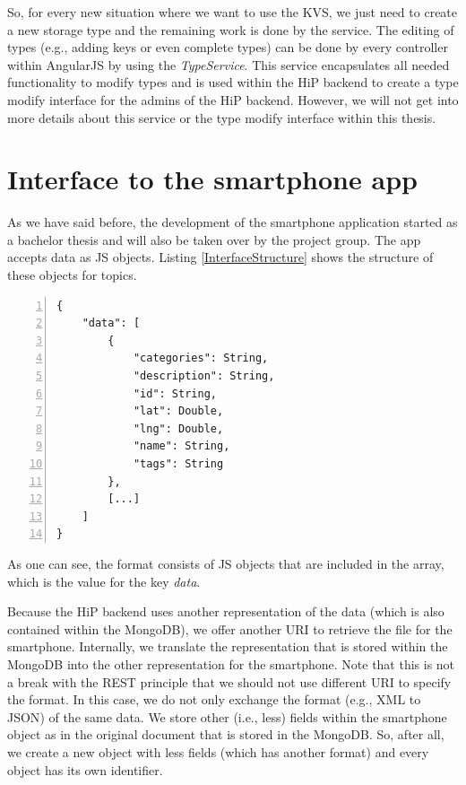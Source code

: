 So, for every new situation where we want to use the \ac{KVS}, we just need to create a new storage type and the remaining work is done by the service. The editing of types (e.g., adding keys or even complete types) can be done by every controller within AngularJS by using the \emph{TypeService}. This service encapsulates all needed functionality to modify types and is used within the \ac{HiP} backend to create a type modify interface for the admins of the \ac{HiP} backend. However, we will not get into more details about this service or the type modify interface within this thesis.

\section{Interface to the smartphone app}
As we have said before, the development of the smartphone application started as a bachelor thesis and will also be taken over by the project group. The app accepts data as \ac{JS} objects. Listing \ref{InterfaceStructure} shows the structure of these objects for topics. 

\begin{lstlisting}[numbers=left,caption={The format of topic files within the smartphone application.},label=InterfaceStructure,frame=tlbr,breaklines]
{
    "data": [
        {
            "categories": String,
            "description": String,
            "id": String,
            "lat": Double,
            "lng": Double,
            "name": String,
            "tags": String
        },
        [...]
    ]
}
\end{lstlisting}

As one can see, the format consists of \ac{JS} objects that are included in the array, which is the value for the key \emph{data}.  

Because the \ac{HiP} backend uses another representation of the data (which is also contained within the MongoDB), we offer another \ac{URI} to retrieve the file for the smartphone. Internally, we translate the representation that is stored within the MongoDB into the other representation for the smartphone. Note that this is not a break with the \ac{REST} principle that we should not use different \ac{URI} to specify the format. In this case, we do not only exchange the format (e.g., \ac{XML} to \ac{JSON}) of the same data. We store other (i.e., less) fields within the smartphone object as in the original document that is stored in the MongoDB. So, after all, we create a new object with less fields (which has another format) and every object has its own identifier. 

